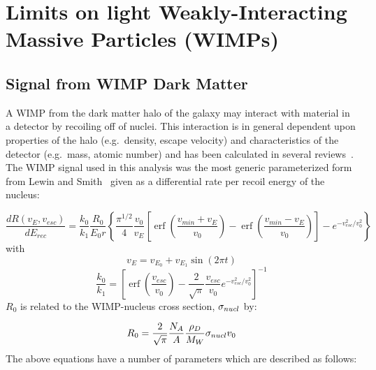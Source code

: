
\chapter{Limits on light Weakly-Interacting Massive Particles (WIMPs)}
\label{chap:DMWIMPLimits}

	\section{Signal from WIMP Dark Matter}
	\label{sec:CalcLimitsOnWIMPSignal}	

	A WIMP from the dark matter halo of the galaxy may interact with material in a detector by recoiling off of nuclei.  This interaction is in general dependent upon properties of the halo (e.g.~density, escape velocity) and characteristics of the detector (e.g.~mass, atomic number) and has been calculated in several reviews~\cite{Lew96,Jun96}.  The WIMP signal used in this analysis was the most generic parameterized form from Lewin and Smith~\cite{Lew96} given as a differential rate per recoil energy of the nucleus:

		\begin{equation}
			\frac{dR (v_{E}, v_{esc})}{dE_{rec}} = 
				\frac{k_{0}}{k_{1}} \frac{R_{0}}{E_{0} r} 
				\left\{ 
			 		\frac{\pi^{1/2}}{4} \frac{v_{0}}{v_{E}} 
					\left[ 
						\operatorname{erf} \left( \frac{v_{min} + v_{E}}{v_{0}} \right) - 
							   \operatorname{erf} \left( \frac{v_{min} - v_{E}}{v_{0}} \right) 
					\right] 
					- e^{-v_{esc}^{2}/v_{0}^{2}} 
				\right\}
			\label{eqn:WIMPMasterEqn}
		\end{equation}
with 
		\[
		v_{E} = v_{E_{0}} + v_{E_{1}}\sin (2 \pi t)
		\]
		\[
		\frac{k_{0}}{k_{1}} = \left[
			\operatorname{erf} \left( \frac{v_{esc}}{v_{0}} \right ) - 
			\frac{2}{\sqrt{\pi}} \frac{v_{esc}}{v_{0}} e^{-v_{esc}^{2}/v_{0}^{2}}
		\right]^{-1}
		\]
$R_{0}$ is related to the WIMP-nucleus cross section, $\sigma_{nucl}$ by:

		\[
			R_{0} = \frac{2}{\sqrt{\pi}} \frac{N_{A}}{A} \frac{\rho_{D}}{M_{W}} \sigma_{nucl} v_{0}
		\]
The above equations have a number of parameters which are described as follows:

